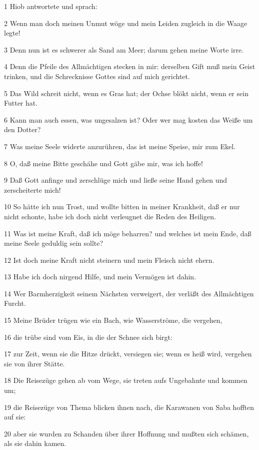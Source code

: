 \par 1 Hiob antwortete und sprach:
\par 2 Wenn man doch meinen Unmut wöge und mein Leiden zugleich in die Waage legte!
\par 3 Denn nun ist es schwerer als Sand am Meer; darum gehen meine Worte irre.
\par 4 Denn die Pfeile des Allmächtigen stecken in mir: derselben Gift muß mein Geist trinken, und die Schrecknisse Gottes sind auf mich gerichtet.
\par 5 Das Wild schreit nicht, wenn es Gras hat; der Ochse blökt nicht, wenn er sein Futter hat.
\par 6 Kann man auch essen, was ungesalzen ist? Oder wer mag kosten das Weiße um den Dotter?
\par 7 Was meine Seele widerte anzurühren, das ist meine Speise, mir zum Ekel.
\par 8 O, daß meine Bitte geschähe und Gott gäbe mir, was ich hoffe!
\par 9 Daß Gott anfinge und zerschlüge mich und ließe seine Hand gehen und zerscheiterte mich!
\par 10 So hätte ich nun Trost, und wollte bitten in meiner Krankheit, daß er nur nicht schonte, habe ich doch nicht verleugnet die Reden des Heiligen.
\par 11 Was ist meine Kraft, daß ich möge beharren? und welches ist mein Ende, daß meine Seele geduldig sein sollte?
\par 12 Ist doch meine Kraft nicht steinern und mein Fleisch nicht ehern.
\par 13 Habe ich doch nirgend Hilfe, und mein Vermögen ist dahin.
\par 14 Wer Barmherzigkeit seinem Nächsten verweigert, der verläßt des Allmächtigen Furcht.
\par 15 Meine Brüder trügen wie ein Bach, wie Wasserströme, die vergehen,
\par 16 die trübe sind vom Eis, in die der Schnee sich birgt:
\par 17 zur Zeit, wenn sie die Hitze drückt, versiegen sie; wenn es heiß wird, vergehen sie von ihrer Stätte.
\par 18 Die Reisezüge gehen ab vom Wege, sie treten aufs Ungebahnte und kommen um;
\par 19 die Reisezüge von Thema blicken ihnen nach, die Karawanen von Saba hofften auf sie:
\par 20 aber sie wurden zu Schanden über ihrer Hoffnung und mußten sich schämen, als sie dahin kamen.
